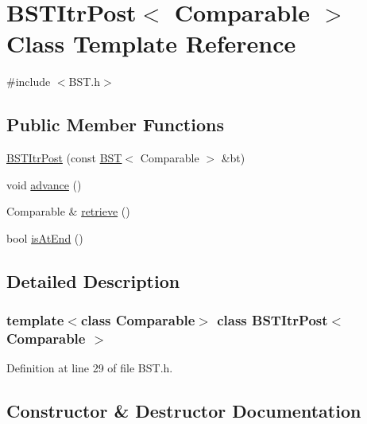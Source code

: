 \hypertarget{class_b_s_t_itr_post}{}\section{B\+S\+T\+Itr\+Post$<$ Comparable $>$ Class Template Reference}
\label{class_b_s_t_itr_post}


{\ttfamily \#include $<$B\+S\+T.\+h$>$}

\subsection*{Public Member Functions}
\begin{DoxyCompactItemize}
\item 
\hyperlink{class_b_s_t_itr_post_acf7e537dea01978f40c40909c55c56c2}{B\+S\+T\+Itr\+Post} (const \hyperlink{class_b_s_t}{B\+ST}$<$ Comparable $>$ \&bt)
\item 
void \hyperlink{class_b_s_t_itr_post_a376098e5a82cd02118dd4dcdec49bb26}{advance} ()
\item 
Comparable \& \hyperlink{class_b_s_t_itr_post_a72446e4d0df0bcafc14294a78faeb56e}{retrieve} ()
\item 
bool \hyperlink{class_b_s_t_itr_post_a2f330e73bb817e8bd1c797805e66ddb7}{is\+At\+End} ()
\end{DoxyCompactItemize}


\subsection{Detailed Description}
\subsubsection*{template$<$class Comparable$>$\newline
class B\+S\+T\+Itr\+Post$<$ Comparable $>$}



Definition at line 29 of file B\+S\+T.\+h.



\subsection{Constructor \& Destructor Documentation}
\hypertarget{class_b_s_t_itr_post_acf7e537dea01978f40c40909c55c56c2}{}\label{class_b_s_t_itr_post_acf7e537dea01978f40c40909c55c56c2} 
